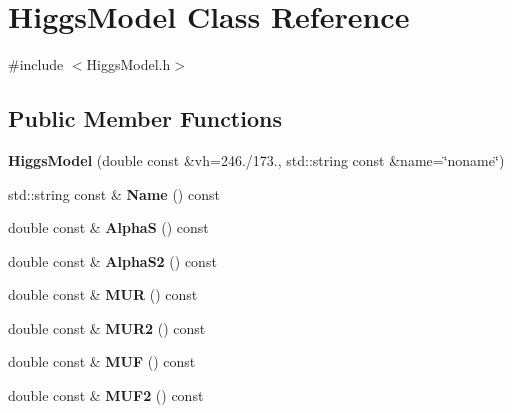 \hypertarget{classHiggsModel}{\section{Higgs\-Model Class Reference}
\label{classHiggsModel}
}


{\ttfamily \#include $<$Higgs\-Model.\-h$>$}

\subsection*{Public Member Functions}
\begin{DoxyCompactItemize}
\item 
\hypertarget{classHiggsModel_aefe9d67a04771e06f9812734de1a606b}{{\bfseries Higgs\-Model} (double const \&vh=246./173., std\-::string const \&name=\char`\"{}noname\char`\"{})}\label{classHiggsModel_aefe9d67a04771e06f9812734de1a606b}

\item 
\hypertarget{classHiggsModel_a29a94aee623c9ce8d874b8b4fba17835}{std\-::string const \& {\bfseries Name} () const }\label{classHiggsModel_a29a94aee623c9ce8d874b8b4fba17835}

\item 
\hypertarget{classHiggsModel_a343a0ea0a7a22e78c3504dc64d4d6184}{double const \& {\bfseries Alpha\-S} () const }\label{classHiggsModel_a343a0ea0a7a22e78c3504dc64d4d6184}

\item 
\hypertarget{classHiggsModel_a41c108f3545d39dbb23835d781a163ee}{double const \& {\bfseries Alpha\-S2} () const }\label{classHiggsModel_a41c108f3545d39dbb23835d781a163ee}

\item 
\hypertarget{classHiggsModel_aca6071e5666fa030cacb0a11efaa1f22}{double const \& {\bfseries M\-U\-R} () const }\label{classHiggsModel_aca6071e5666fa030cacb0a11efaa1f22}

\item 
\hypertarget{classHiggsModel_a2f76729834fcbab6bb0b8c8595c05983}{double const \& {\bfseries M\-U\-R2} () const }\label{classHiggsModel_a2f76729834fcbab6bb0b8c8595c05983}

\item 
\hypertarget{classHiggsModel_a24085f73b5e2858e86db20470f8e5c9f}{double const \& {\bfseries M\-U\-F} () const }\label{classHiggsModel_a24085f73b5e2858e86db20470f8e5c9f}

\item 
\hypertarget{classHiggsModel_af636a81480654395084ead903d5ee00b}{double const \& {\bfseries M\-U\-F2} () const }\label{classHiggsModel_af636a81480654395084ead903d5ee00b}


\end{DoxyCompactItemize}
